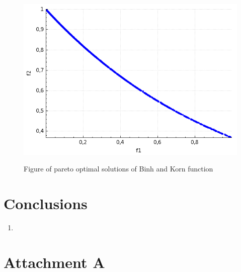 \documentclass[a4paper, 11pt]{article}
\begin{document}
	\begin{figure}[H]
	\caption{Figure of pareto optimal solutions of Binh and Korn function}
	\centering
	\includegraphics[scale=0.4]{ctp1}
	\label{fig:ctp1}
	\end{figure}

	\newpage
	\section{Conclusions}
	
	\begin{enumerate}
		\item
	\end{enumerate}
	
	\newpage	
	\section*{Attachment A}
	
\end{document}
